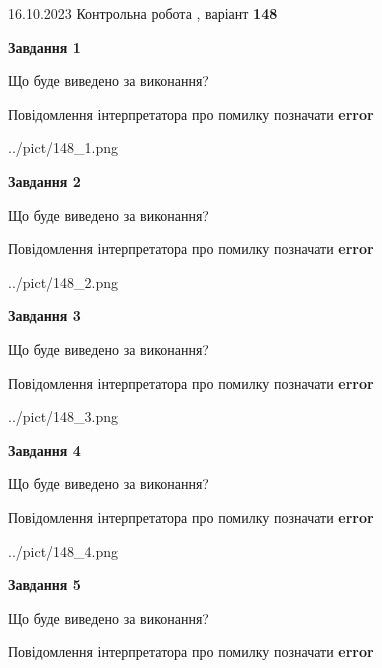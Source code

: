 \documentclass[12pt, ukrainian]{article}
\begin{document}
{\Large{16.10.2023 Контрольна робота , варіант  \No \textbf { 148 }\par}}
{
\begin {large}
{\begin {center}\textbf{Завдання 1}\end {center}}\par
Що буде виведено за виконання? \par
Повідомлення інтерпретатора про помилку позначати \textbf{error}

\begin{center}
	{../pict/148_1.png}
\end{center}
\newpage

{\begin {center}\textbf{Завдання 2}\end {center}}\par
Що буде виведено за виконання? \par
Повідомлення інтерпретатора про помилку позначати \textbf{error}

\begin{center}
	{../pict/148_2.png}
\end{center}
\newpage

{\begin {center}\textbf{Завдання 3}\end {center}}\par
Що буде виведено за виконання? \par
Повідомлення інтерпретатора про помилку позначати \textbf{error}

\begin{center}
	{../pict/148_3.png}
\end{center}
\newpage

{\begin {center}\textbf{Завдання 4}\end {center}}\par
Що буде виведено за виконання? \par
Повідомлення інтерпретатора про помилку позначати \textbf{error}

\begin{center}
	{../pict/148_4.png}
\end{center}
\newpage

{\begin {center}\textbf{Завдання 5}\end {center}}\par
Що буде виведено за виконання? \par
Повідомлення інтерпретатора про помилку позначати \textbf{error}


\end{large}}
\end{document}
